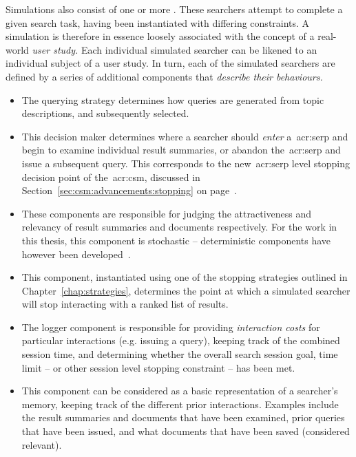 Simulations also consist of one or more . These searchers attempt to complete a given search task, having been instantiated with differing constraints. A simulation is therefore in essence loosely associated with the concept of a real-world \emph{user study.} Each individual simulated searcher can be likened to an individual subject of a user study. In turn, each of the simulated searchers are defined by a series of additional components that \emph{describe their behaviours.}

\begin{itemize}
    \item{ The querying strategy determines how queries are generated from topic descriptions, and subsequently selected.}
    \item{ This decision maker determines where a searcher should \emph{enter} a~\gls{acr:serp} and begin to examine individual result summaries, or abandon the~\gls{acr:serp} and issue a subsequent query. This corresponds to the new~\gls{acr:serp} level stopping decision point of the~\gls{acr:csm}, discussed in Section~\ref{sec:csm:advancements:stopping} on page~\pageref{sec:csm:advancements:stopping}.}
    \item{ These components are responsible for judging the attractiveness and relevancy of result summaries and documents respectively. For the work in this thesis, this component is stochastic -- deterministic components have however been developed~\citep{maxwell2016agents}.}
    \item{ This component, instantiated using one of the stopping strategies outlined in Chapter~\ref{chap:strategies}, determines the point at which a simulated searcher will stop interacting with a ranked list of results.}
    \item{ The logger component is responsible for providing \emph{interaction costs} for particular interactions (e.g. issuing a query), keeping track of the combined session time, and determining whether the overall search session goal, time limit -- or other session level stopping constraint -- has been met.}
    \item{ This component can be considered as a basic representation of a searcher's memory, keeping track of the different prior interactions. Examples include the result summaries and documents that have been examined, prior queries that have been issued, and what documents that have been saved (considered relevant).}
\end{itemize}


